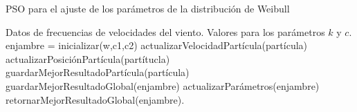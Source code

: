 
\begin{algorithm}[h!]
\caption{PSO para el ajuste de los parámetros de la distribución de Weibull}
\label{alg:pso}
\begin{algorithmic}
\REQUIRE Datos de frecuencias de velocidades del viento.
\ENSURE Valores para los parámetros $k$ y $c$.
\STATE enjambre = inicializar(w,c1,c2)
    \STATE actualizarVelocidadPartícula(partícula)
    \STATE actualizarPosiciónPartícula(partítucla)
    \STATE guardarMejorResultadoPartícula(partícula)
\ENDFOR
\STATE guardarMejorResultadoGlobal(enjambre)
\STATE actualizarParámetros(enjambre)
\ENDFOR
\STATE retornarMejorResultadoGlobal(enjambre).
\end{algorithmic}
\end{algorithm}
